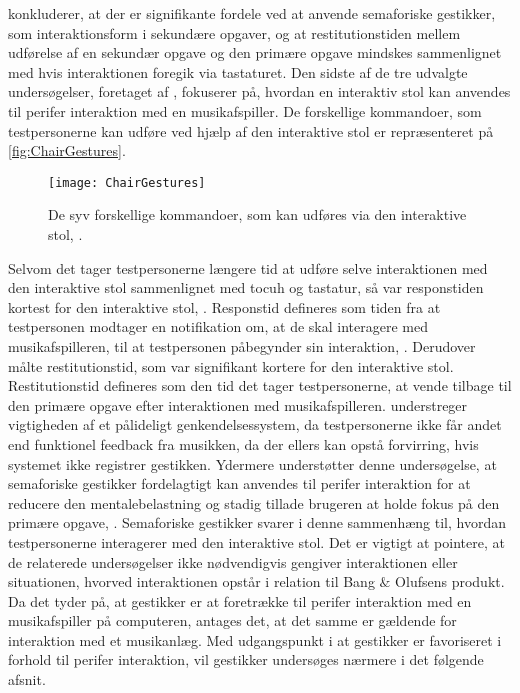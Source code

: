 \textcite[s. 1964]{PDF:AStudyOnTheUseOfSemaphoricGestures} konkluderer, at der er signifikante fordele ved at anvende semaforiske gestikker, som interaktionsform i sekundære opgaver, og at restitutionstiden mellem udførelse af en sekundær opgave og den primære opgave mindskes sammenlignet med hvis interaktionen foregik via tastaturet.\blankline
%
Den sidste af de tre udvalgte undersøgelser, foretaget af \textcite[ss. 6-9]{PDF:AChairAsUbiquitousInputDevice}, fokuserer på, hvordan en interaktiv stol kan anvendes til perifer interaktion med en musikafspiller. De forskellige kommandoer, som testpersonerne kan udføre ved hjælp af den interaktive stol er repræsenteret på \autoref{fig:ChairGestures}. 
%
\begin{figure}[H]
	\centering
	\texttt{[image: ChairGestures]}
	\caption{De syv forskellige kommandoer, som kan udføres via den interaktive stol, \parencite[s. 3]{PDF:AChairAsUbiquitousInputDevice}.}
	\label{fig:ChairGestures}
\end{figure}
\noindent
%
Selvom det tager testpersonerne længere tid at udføre selve interaktionen med den interaktive stol sammenlignet med tocuh og tastatur, så var responstiden kortest for den interaktive stol, \textcite[s. 7]{PDF:AChairAsUbiquitousInputDevice}. Responstid defineres som tiden fra at testpersonen modtager en notifikation om, at de skal interagere med musikafspilleren, til at testpersonen påbegynder sin interaktion, \parencite[s. 6]{PDF:AChairAsUbiquitousInputDevice}. Derudover målte \textcite[s. 7]{PDF:AChairAsUbiquitousInputDevice} restitutionstid, som var signifikant kortere for den interaktive stol. Restitutionstid defineres som den tid det tager testpersonerne, at vende tilbage til den primære opgave efter interaktionen med musikafspilleren. \textcite[s. 8]{PDF:AChairAsUbiquitousInputDevice} understreger vigtigheden af et pålideligt genkendelsessystem, da testpersonerne ikke får andet end funktionel feedback fra musikken, da der ellers kan opstå forvirring, hvis systemet ikke registrer gestikken. Ydermere understøtter denne undersøgelse, at semaforiske gestikker fordelagtigt kan anvendes til perifer interaktion for at reducere den mentalebelastning og stadig tillade brugeren at holde fokus på den primære opgave, \parencite[s. 8]{PDF:AChairAsUbiquitousInputDevice}. Semaforiske gestikker svarer i denne sammenhæng til, hvordan testpersonerne interagerer med den interaktive stol. \blankline
%
Det er vigtigt at pointere, at de relaterede undersøgelser ikke nødvendigvis gengiver interaktionen eller situationen, hvorved interaktionen opstår i relation til Bang $\&$ Olufsens produkt. Da det tyder på, at gestikker er at foretrække til perifer interaktion med en musikafspiller på computeren, antages det, at det samme er gældende for interaktion med et musikanlæg. Med udgangspunkt i at gestikker er favoriseret i forhold til perifer interaktion, vil gestikker undersøges nærmere i det følgende afsnit. 


